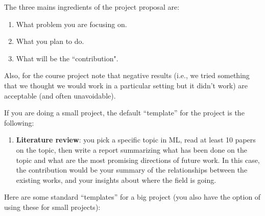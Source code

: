 \documentclass{article}
\def\blu#1{{\color{blu}#1}}
\def\enum#1{\begin{enumerate}#1\end{enumerate}}
\begin{document}
\blu{The three mains ingredients of the project proposal are:
\begin{enumerate}
\item What problem you are focusing on.
\item What you plan to do.
\item What will be the ``contribution".
\end{enumerate}
}
Also, for the course project note that negative results (i.e., we tried something that we thought we would work in a particular setting but it didn't work) are acceptable (and often unavoidable).

If you are doing a small project, the default ``template'' for the project is the following:
\enum{
\item \textbf{Literature review}: you pick a specific topic in ML, read at least 10 papers on the topic, then write a report summarizing what has been done on the topic and what are the most promising directions of future work. In this case, the contribution would be your summary of the relationships between the existing works, and your insights about where the field is going.
}
Here are some standard ``templates'' for a big project (you also have the option of using these for small projects):
\end{document}
